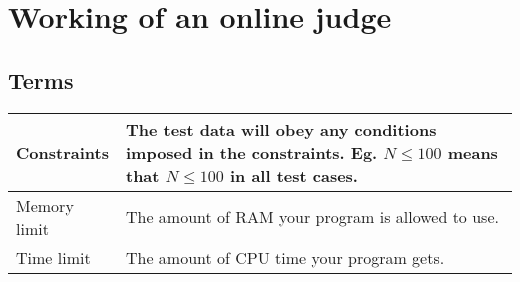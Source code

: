 \section{Working of an online judge}
    \subsection{Terms}
        \begin{center}
            \begin{tabular}{| l | p{28em} |}
                \hline
                Constraints & The test data will obey any conditions imposed in the constraints. Eg. $N \leq 100$ means that $N \leq 100$ in all test cases. \\
                \hline
                Memory limit & The amount of RAM your program is allowed to use. \\
                \hline
                Time limit & The amount of CPU time your program gets. \\
                \hline
            \end{tabular}
        \end{center}
